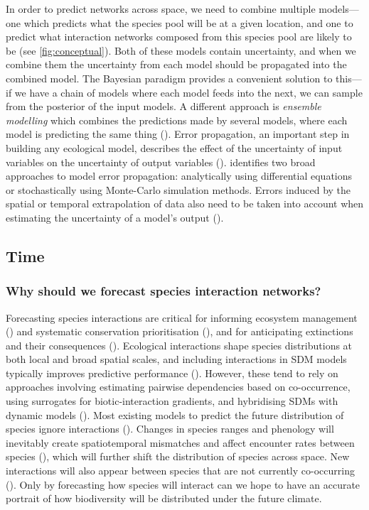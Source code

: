 \begin{refsection}
In order to predict networks across space, we need to combine multiple
models---one which predicts what the species pool will be at a given
location, and one to predict what interaction networks composed from
this species pool are likely to be (see \autoref{fig:conceptual}). Both of these
models contain uncertainty, and when we combine them the uncertainty
from each model should be propagated into the combined model. The
Bayesian paradigm provides a convenient solution to this---if we have a
chain of models where each model feeds into the next, we can sample from
the posterior of the input models. A different approach is
\emph{ensemble modelling} which combines the predictions made by several
models, where each model is predicting the same thing
(\cite{Parker2013EnsMod}). Error propagation, an important step in
building any ecological model, describes the effect of the uncertainty
of input variables on the uncertainty of output variables
(\cite{Draper1995AssPro, Parysow2000EffApp}). \cite{Benke2018ErrPro} identifies
two broad approaches to model error propagation: analytically using
differential equations or stochastically using Monte-Carlo simulation
methods. Errors induced by the spatial or temporal extrapolation of data
also need to be taken into account when estimating the uncertainty of a
model's output (\cite{Peters2004StrEco}).

\subsection{Time}\label{time}

\subsubsection{Why should we forecast species interaction
networks?}\label{why-should-we-forecast-species-interaction-networks}

Forecasting species interactions are critical for informing ecosystem
management (\cite{Harvey2017BriEco}) and systematic conservation
prioritisation (\cite{Pollock2020ProBio}), and for anticipating
extinctions and their consequences (\cite{McDonald-Madden2016UsiFoo,
McWilliams2019StaMul}). Ecological interactions shape species
distributions at both local and broad spatial scales, and including
interactions in SDM models typically improves predictive performance
(\cite{Araujo2007ImpBio, Wisz2013RolBio, Pigot2013SpeInt}). However,
these tend to rely on approaches involving estimating pairwise
dependencies based on co-occurrence, using surrogates for
biotic-interaction gradients, and hybridising SDMs with dynamic models
(\cite{Wisz2013RolBio}). Most existing models to predict the future
distribution of species ignore interactions (\cite{Urban2016ImpFor}).
Changes in species ranges and phenology will inevitably create
spatiotemporal mismatches and affect encounter rates between species
(\cite{Gilman2010FraCom}), which will further shift the distribution of
species across space. New interactions will also appear between species
that are not currently co-occurring (\cite{Gilman2010FraCom}). Only by
forecasting how species will interact can we hope to have an accurate
portrait of how biodiversity will be distributed under the future
climate.


\end{refsection}
